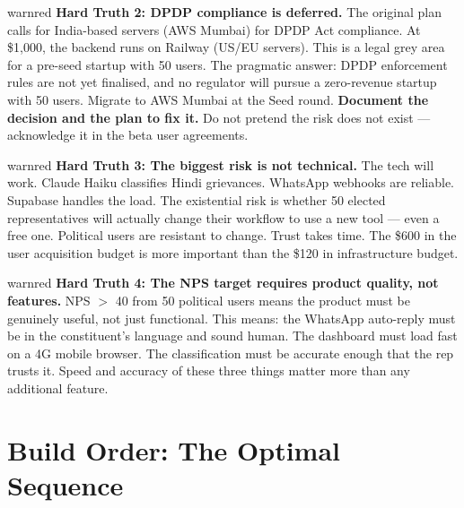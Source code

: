 \documentclass[12pt, a4paper]{article}
\begin{document}
\vspace{0.5em}

\begin{insightbox}{warnred}
\textbf{Hard Truth 2: DPDP compliance is deferred.}
The original plan calls for India-based servers (AWS Mumbai) for DPDP Act compliance.
At \$1,000, the backend runs on Railway (US/EU servers). This is a legal grey area for
a pre-seed startup with 50 users. The pragmatic answer: DPDP enforcement rules are not
yet finalised, and no regulator will pursue a zero-revenue startup with 50 users.
Migrate to AWS Mumbai at the Seed round. \textbf{Document the decision and the plan to fix it.}
Do not pretend the risk does not exist --- acknowledge it in the beta user agreements.
\end{insightbox}

\vspace{0.5em}

\begin{insightbox}{warnred}
\textbf{Hard Truth 3: The biggest risk is not technical.}
The tech will work. Claude Haiku classifies Hindi grievances. WhatsApp webhooks are
reliable. Supabase handles the load. The existential risk is whether 50 elected
representatives will actually change their workflow to use a new tool --- even a free one.
Political users are resistant to change. Trust takes time. The \$600 in the user
acquisition budget is more important than the \$120 in infrastructure budget.
\end{insightbox}

\vspace{0.5em}

\begin{insightbox}{warnred}
\textbf{Hard Truth 4: The NPS target requires product quality, not features.}
NPS $>$ 40 from 50 political users means the product must be genuinely useful,
not just functional. This means: the WhatsApp auto-reply must be in the constituent's
language and sound human. The dashboard must load fast on a 4G mobile browser.
The classification must be accurate enough that the rep trusts it.
Speed and accuracy of these three things matter more than any additional feature.
\end{insightbox}

\newpage

\section{Build Order: The Optimal Sequence}
\end{document}
